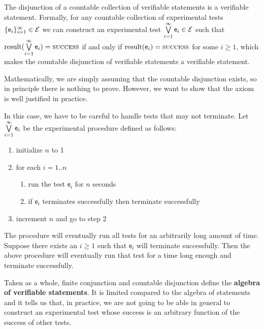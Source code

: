 \documentclass[11pt,letterpaper,fleqn]{memoir} %
\begin{document}
\begin{mathSection}
	\begin{axiom}\label{def_experimental_test_OR}
	The disjunction of a countable collection of verifiable statements is a verifiable statement. Formally, for any countable collection of experimental tests $\{\mathsf{e}_i\}_{i=1}^{\infty} \in \mathcal{E}$ we can construct an experimental test $ \bigvee\limits_{i=1}^{\infty} \mathsf{e}_i \in \mathcal{E}$ such that $\operatorname{result}(\bigvee\limits_{i=1}^{\infty} \mathsf{e}_i) = \textsc{success}$ if and only if $\operatorname{result}(\mathsf{e}_i) = \textsc{success}$ for some $i \geq 1$, which makes the countable disjunction of verifiable statements a verifiable statement.
	\end{axiom}
	\begin{justification}
		Mathematically, we are simply assuming that the countable disjunction exists, so in principle there is nothing to prove. However, we want to show that the axiom is well justified in practice.
		
		In this case, we have to be careful to handle tests that may not terminate.
		Let $\bigvee\limits_{i=1}^{\infty} \mathsf{e}_i$ be the experimental procedure defined as follows:
		\begin{enumerate}
			\item initialize $n$ to 1
			\item for each $i=1..n$
			\begin{enumerate}
				\item run the test $\mathsf{e}_i$ for $n$ seconds
				\item if $\mathsf{e}_i$ terminates successfully then terminate successfully
			\end{enumerate}
			\item increment $n$ and go to step 2
		\end{enumerate}
		The procedure will eventually run all tests for an arbitrarily long amount of time. Suppose there exists an $i \geq 1$ such that $\mathsf{e}_i$ will terminate successfully. Then the above procedure will eventually run that test for a time long enough and terminate successfully.
	\end{justification}
\end{mathSection}

Taken as a whole, finite conjunction and countable disjunction define the \textbf{algebra of verifiable statements}. It is limited compared to the algebra of statements and it tells us that, in practice, we are not going to be able in general to construct an experimental test whose success is an arbitrary function of the success of other tests.
\end{document}
